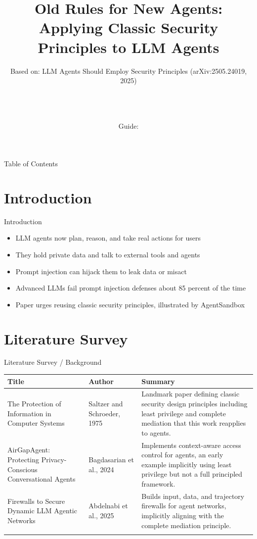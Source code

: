 \documentclass[10pt]{beamer}
\title[B.Tech Seminar]{Old Rules for New Agents: Applying Classic Security Principles to LLM Agents}
\subtitle{Based on: LLM Agents Should Employ Security Principles (arXiv:2505.24019, 2025)}
\author[\studentname\ (\shortinst)]{\studentname \\ \small \rollno \\ \small \rollclass \\ \small Guide: \guidename}
\institute[]{\deptname \\ \collegename}
\date{\seminardate}
\begin{document}
\begin{frame}[plain]
  \titlepage
\end{frame}

\begin{frame}{Table of Contents}
  \tableofcontents
\end{frame}

\section{Introduction}
\begin{frame}{Introduction}
\begin{itemize}
  \item LLM agents now plan, reason, and take real actions for users
  \item They hold private data and talk to external tools and agents
  \item Prompt injection can hijack them to leak data or misact
  \item Advanced LLMs fail prompt injection defenses about 85 percent of the time
  \item Paper urges reusing classic security principles, illustrated by AgentSandbox
\end{itemize}
\end{frame}

\section{Literature Survey}
\begin{frame}{Literature Survey / Background}
  \small
  \begin{tabular}{@{}p{2.7cm}p{2.3cm}p{5.6cm}@{}}
    \toprule
    \textbf{Title} & \textbf{Author} & \textbf{Summary} \\
    \midrule
    The Protection of Information in Computer Systems & Saltzer and Schroeder, 1975 & Landmark paper defining classic security design principles including least privilege and complete mediation that this work reapplies to agents. \\
    \addlinespace
    AirGapAgent: Protecting Privacy-Conscious Conversational Agents & Bagdasarian et al., 2024 & Implements context-aware access control for agents, an early example implicitly using least privilege but not a full principled framework. \\
    \addlinespace
    Firewalls to Secure Dynamic LLM Agentic Networks & Abdelnabi et al., 2025 & Builds input, data, and trajectory firewalls for agent networks, implicitly aligning with the complete mediation principle. \\
    \addlinespace
    \bottomrule
  \end{tabular}
\end{frame}
\end{document}
